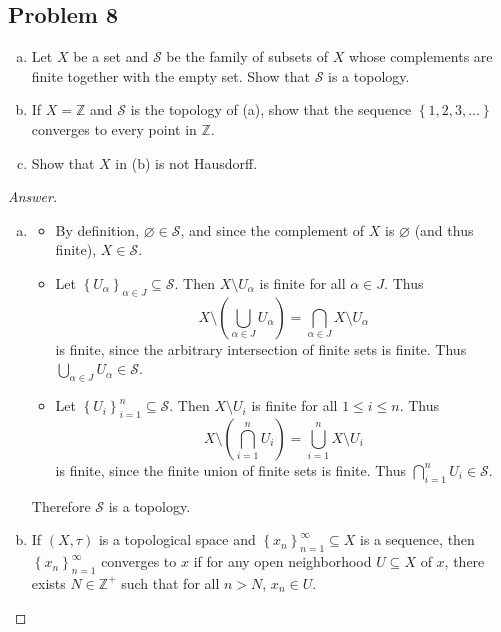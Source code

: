 \documentclass[12pt]{article}
\newcommand{\z}{\mathbb{Z}}
\newcommand\paren[1]{\left( #1 \right)}
\newcommand\setb[1]{\left \{ #1 \right \}}
\theoremstyle{definition}
\begin{document}
\subsection{Problem 8}
\begin{enumerate}[(a)]
    \item Let $X$ be a set and $\mathcal{S}$ be the family of subsets of $X$ whose complements are finite together with the empty set. Show that $\mathcal{S}$ is a topology.
    \item If $X = \z$ and $\mathcal{S}$ is the topology of (a), show that the sequence $\setb{1,2,3,\dotsc}$ converges to every point in $\z$.
    \item Show that $X$ in (b) is not Hausdorff.
\end{enumerate}
\begin{proof}[Answer]
    \noindent
    \begin{enumerate}[(a)]
        \item 
        \begin{itemize}
            \item By definition, $\varnothing \in \mathcal{S}$, and since the complement of $X$ is $\varnothing$ (and thus finite), $X \in \mathcal{S}$.
            \item Let $\setb{ U_{\alpha} }_{\alpha \in J} \subseteq \mathcal{S}$. Then $X \setminus U_{\alpha}$ is finite for all $\alpha \in J$. Thus 
            \[
                X \setminus \paren{ \bigcup\limits_{\alpha \in J} U_{\alpha} } = \bigcap\limits_{\alpha \in J} X \setminus U_{\alpha}
            \]
            is finite, since the arbitrary intersection of finite sets is finite. Thus $\bigcup\limits_{\alpha \in J} U_{\alpha} \in \mathcal{S}$.
            \item Let $\setb{ U_i }_{i = 1}^n \subseteq \mathcal{S}$. Then $X \setminus U_i$ is finite for all $1 \leq i \leq n$. Thus 
            \[
                X \setminus \paren{ \bigcap\limits_{i = 1}^n U_i } = \bigcup\limits_{i = 1}^n X \setminus U_{i}
            \]
            is finite, since the finite union of finite sets is finite. Thus $\bigcap\limits_{i = 1}^n U_i \in \mathcal{S}$.
        \end{itemize}
        Therefore $\mathcal{S}$ is a topology.
        \item If $(X,\tau)$ is a topological space and $\setb{ x_n }_{n = 1}^{\infty} \subseteq X$ is a sequence, then $\setb{ x_n }_{n = 1}^{\infty}$ converges to $x$ if for any open neighborhood $U \subseteq X$ of $x$, there exists $N \in \z^+$ such that for all $n > N$, $x_n \in U$. 
        

\end{enumerate}
\end{proof}
\end{document}
